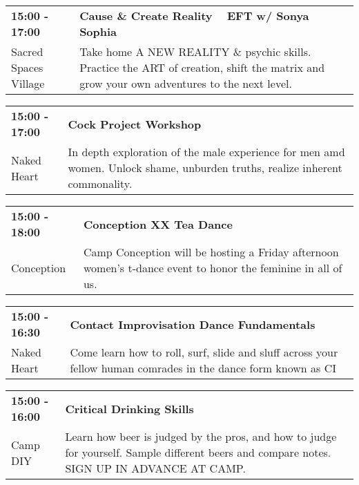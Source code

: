 \begin{tabular}{ p{1in} p{2.2in} }
    \textbf{15:00 - 17:00} & \textbf{Cause \& Create Reality ~ EFT w/ Sonya Sophia} \\
    Sacred Spaces Village \newline  & Take home A NEW REALITY \& psychic skills. Practice the ART of creation, shift the matrix and grow your own adventures to the next level. \\
    \hline 
\end{tabular}
    
\begin{tabular}{ p{1in} p{2.2in} }
    \textbf{15:00 - 17:00} & \textbf{Cock Project Workshop} \\
    Naked Heart \newline  & In depth exploration of the male experience for men amd women. Unlock shame, unburden truths, realize inherent commonality. \\
    \hline 
\end{tabular}
    
\begin{tabular}{ p{1in} p{2.2in} }
    \textbf{15:00 - 18:00} & \textbf{Conception XX Tea Dance} \\
    Conception \newline  & Camp Conception will be hosting a Friday afternoon women's t-dance event to honor the feminine in all of us. \\
    \hline 
\end{tabular}
    
\begin{tabular}{ p{1in} p{2.2in} }
    \textbf{15:00 - 16:30} & \textbf{Contact Improvisation Dance Fundamentals} \\
    Naked Heart \newline  & Come learn how to roll, surf, slide and sluff across your fellow human comrades in the dance form known as CI \\
    \hline 
\end{tabular}
    
\begin{tabular}{ p{1in} p{2.2in} }
    \textbf{15:00 - 16:00} & \textbf{Critical Drinking Skills } \\
    Camp DIY \newline  & Learn how beer is judged by the pros, and how to judge for yourself. Sample different beers and compare notes. SIGN UP IN ADVANCE AT CAMP. \\
    \hline 
\end{tabular}
    
